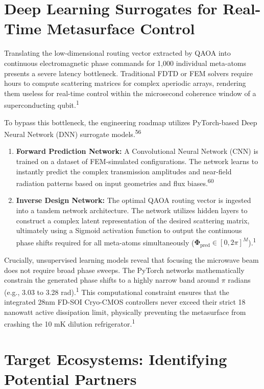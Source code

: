 \documentclass[11pt, a4paper]{article}
\begin{document}
\section{Deep Learning Surrogates for Real-Time Metasurface Control}

Translating the low-dimensional routing vector extracted by QAOA into continuous electromagnetic phase commands for 1,000 individual meta-atoms presents a severe latency bottleneck. Traditional FDTD or FEM solvers require hours to compute scattering matrices for complex aperiodic arrays, rendering them useless for real-time control within the microsecond coherence window of a superconducting qubit.\textsuperscript{1}

To bypass this bottleneck, the engineering roadmap utilizes PyTorch-based Deep Neural Network (DNN) surrogate models.\textsuperscript{56}
\begin{enumerate}
    \item \textbf{Forward Prediction Network:} A Convolutional Neural Network (CNN) is trained on a dataset of FEM-simulated configurations. The network learns to instantly predict the complex transmission amplitudes and near-field radiation patterns based on input geometries and flux biases.\textsuperscript{60}
    \item \textbf{Inverse Design Network:} The optimal QAOA routing vector is ingested into a tandem network architecture. The network utilizes hidden layers to construct a complex latent representation of the desired scattering matrix, ultimately using a Sigmoid activation function to output the continuous phase shifts required for all meta-atoms simultaneously ($ \mathbf{\Phi}_{\text{pred}} \in [0, 2\pi]^M $).\textsuperscript{1}
\end{enumerate}

Crucially, unsupervised learning models reveal that focusing the microwave beam does not require broad phase sweeps. The PyTorch networks mathematically constrain the generated phase shifts to a highly narrow band around $\pi$ radians (e.g., 3.03 to 3.28 rad).\textsuperscript{1} This computational constraint ensures that the integrated 28nm FD-SOI Cryo-CMOS controllers never exceed their strict 18 nanowatt active dissipation limit, physically preventing the metasurface from crashing the 10 mK dilution refrigerator.\textsuperscript{1}

\section{Target Ecosystems: Identifying Potential Partners}
\end{document}
